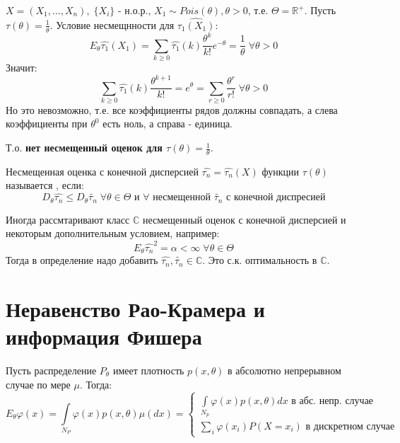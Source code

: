 \begin{example}[]\label{lec:4/example:3}
	$X = (X_1, \dots, X_n), \; \{X_i\}$ - н.о.р., $X_1 \sim Pois (\theta), \theta > 0$, т.е. $\Theta = \mathbb{R}^{+}$. Пусть $\tau(\theta) = \frac{1}{\theta}$. Условие несмещнности для $\hat{\tau_1 (X_1)}$:
	$$E_{\theta} \hat{\tau_1} (X_1) = \underset{k \ge 0}{\overset{}{\sum}} \hat{\tau_1} (k) \frac{\theta^k}{k!}e^{-\theta} = \frac{1}{\theta} \; \forall \theta > 0$$
	Значит:
	$$\underset{k \ge 0}{\overset{}{\sum}} \hat{\tau_1} (k) \frac{\theta^{k+1}}{k!} = e^{\theta} = \underset{r \ge 0}{\overset{}{\sum}}\frac{\theta^r}{r!} \; \forall \theta > 0$$
	Но это невозможно, т.е. все коэффициенты рядов должны совпадать, а слева коэффициенты при $\theta^0$ есть ноль, а справа - единица.
	
	Т.о. \textbf{нет несмещенный оценок для $\tau(\theta) = \frac{1}{\theta}$}.
\end{example}

\begin{definition}\label{lec:4/def:5}
	Несмещенная оценка с конечной дисперсией $\hat{\tau_n} = \hat{\tau_n}(X)$ функции $\tau(\theta)$ называется , если:
	$$D_{\theta} \hat{\tau_n} \le D_{\theta} \tilde{\tau_n} \; \forall \theta \in \Theta \text{ и } \forall \text{ несмещенной } \tilde{\tau_n} \text{ с конечной диспресией}$$
\end{definition}

\begin{remark}\label{lec:4/remark:2}
	Иногда рассмтаривают класс $\mathbb{C}$ несмещенный оценок с конечной дисперсией и некоторым дополнительным условием, например: 
	$$E_{\theta} \hat{\tau_n}^2 = \alpha < \infty \; \forall \theta \in \Theta$$ 
	Тогда в определение надо добавить $\hat{\tau_n}, \tilde{\tau_n} \in \mathbb{C}$. Это с.к. оптимальность в $\mathbb{C}$.
\end{remark}

\section{Неравенство Рао-Крамера и информация Фишера}\label{lec:4/sec:2}

Пусть распределение $P_{\theta}$ имеет плотность $p(x, \theta)$ в абсолютно непрерывном случае по мере $\mu$. Тогда:
$$E_{\theta} \varphi(x) = \underset{N_P}{\overset{}{\int}} \varphi(x) p(x, \theta) \mu (dx) = \begin{cases}
	\underset{N_p}{\overset{}{\int}}\varphi(x) p(x, \theta) dx \text{ в абс. непр. случае}\\
	\underset{i}{\overset{}{\sum}}\varphi(x_i) P(X = x_i) \text{ в дискретном случае}
\end{cases}$$

